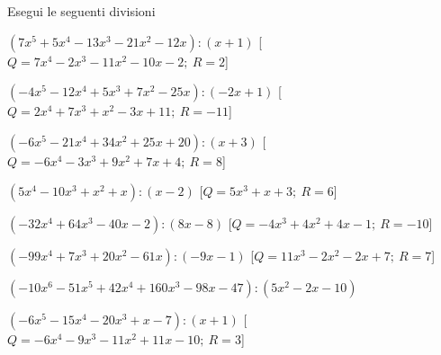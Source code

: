 \begin{esercizio}\label{ese:}
 Esegui le seguenti divisioni
 \begin{enumeratea}
  \item  \(\left(7 x^5 +5 x^4 -13 x^3 -21 x^2 -12 x  \right) : \left(x +1 
\right)\)
   \hfill [\(Q = 7 x^4 -2 x^3 -11 x^2 -10 x -2;~R = 2\)]
  \item  \(\left(-4 x^5 -12 x^4 +5 x^3 +7 x^2 -25 x  \right) : \left(-2 x +1 
\right)\)
   \hfill [\(Q = 2 x^4 +7 x^3 + x^2 -3 x +11;~R = -11\)]
  \item  \(\left(-6 x^5 -21 x^4 +34 x^2 +25 x +20 \right) : \left(x +3 \right)\)
   \hfill [\(Q = -6 x^4 -3 x^3 +9 x^2 +7 x +4;~R = 8\)]
  \item  \(\left(5 x^4 -10 x^3 + x^2 + x  \right) : \left(x -2 \right)\)
   \hfill [\(Q = 5 x^3 + x +3;~R = 6\)]
  \item  \(\left(-32 x^4 +64 x^3 -40 x -2 \right) : \left(8 x -8 \right)\)
   \hfill [\(Q = -4 x^3 +4 x^2 +4 x -1;~R = -10\)]
  \item  \(\left(-99 x^4 +7 x^3 +20 x^2 -61 x  \right) : \left(-9 x -1 \right)\)
   \hfill [\(Q = 11 x^3 -2 x^2 -2 x +7;~R = 7\)]
  \item  \(\left(-10 x^6 -51 x^5 +42 x^4 +160 x^3 -98 x -47 \right) : \left(5 
           x^2 -2 x -10 \right)\)
   \begin{flushright}
    [\(Q = -2 x^4 -11 x^3 +10 x +4;~R = 10 x -7\)]
   \end{flushright}
  \item  \(\left(-6 x^5 -15 x^4 -20 x^3 + x -7 \right) : \left(x +1 \right)\)
   \hfill [\(Q = -6 x^4 -9 x^3 -11 x^2 +11 x -10;~R = 3\)]
 \end{enumeratea}
\end{esercizio}

